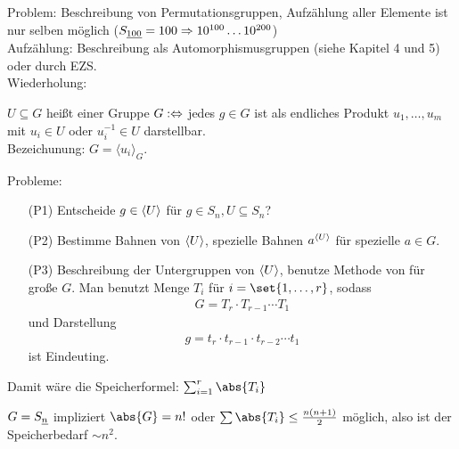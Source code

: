 Problem: Beschreibung von Permutationsgruppen, Aufzählung aller Elemente ist nur selben möglich ($S_{\uline{100}} = 100 \implies 10^{100} \dots 10^{200}$)\\
Aufzählung: Beschreibung als Automorphismusgruppen (siehe Kapitel 4 und 5) oder durch EZS.\\
Wiederholung:
\begin{definition}
	$U \subseteq G$ heißt  einer Gruppe $G :\Leftrightarrow$ jedes $g \in G$ ist als endliches Produkt $u_1, \dots, u_m$ mit $u_i \in U$ oder $u^{-1}_i \in U$ darstellbar.\\
	Bezeichunung: $G = \langle u_i \rangle_G$.
\end{definition}
Probleme:
\begin{itemize}
	\item[(P1)] Entscheide $g \in \langle U \rangle$ für $g \in S_n, U \subseteq S_n$?
	\item[(P2)] Bestimme Bahnen von $\langle U \rangle$, spezielle Bahnen $a^{\langle U \rangle}$ für spezielle $a \in G$.
	\item[(P3)] Beschreibung der Untergruppen von $\langle U \rangle$, benutze Methode von  für große $G$. Man benutzt Menge $T_i$ für $i =\set{1,\dots,r}$, sodass
	\begin{align*}
		G = T_r \cdot T_{r-1} \cdots T_1
	\end{align*}
	und Darstellung
	\begin{align*}
		g = t_r \cdot t_{r-1} \cdot t_{r-2}\cdots t_1
	\end{align*}
	ist Eindeuting.
\end{itemize}
Damit wäre die Speicherformel: $\sum_{i=1}^r \abs{T_i}$
\begin{*example}
	$G = S_{\uline{n}}$ impliziert $\abs{G} = n!$ oder $\sum \abs{T_i} \le \frac{n(n+1)}{2}$ möglich, also ist der Speicherbedarf $\sim n^2$.
\end{*example}
